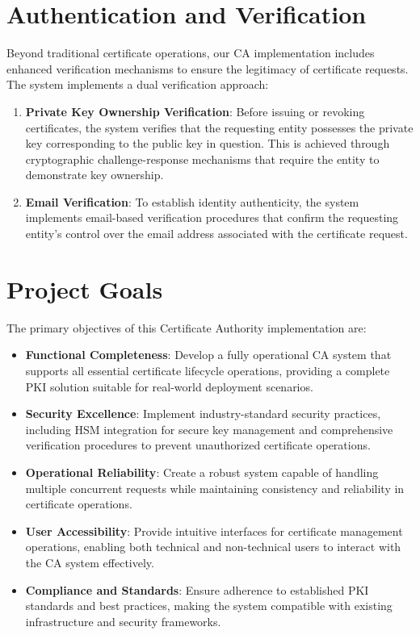 \section{Authentication and Verification}

Beyond traditional certificate operations, our CA implementation includes enhanced verification mechanisms to ensure the legitimacy of certificate requests. The system implements a dual verification approach:

\begin{enumerate}
    \item \textbf{Private Key Ownership Verification}: Before issuing or revoking certificates, the system verifies that the requesting entity possesses the private key corresponding to the public key in question. This is achieved through cryptographic challenge-response mechanisms that require the entity to demonstrate key ownership.
    
    \item \textbf{Email Verification}: To establish identity authenticity, the system implements email-based verification procedures that confirm the requesting entity's control over the email address associated with the certificate request.
\end{enumerate}

\section{Project Goals}

The primary objectives of this Certificate Authority implementation are:

\begin{itemize}
    \item \textbf{Functional Completeness}: Develop a fully operational CA system that supports all essential certificate lifecycle operations, providing a complete PKI solution suitable for real-world deployment scenarios.
    
    \item \textbf{Security Excellence}: Implement industry-standard security practices, including HSM integration for secure key management and comprehensive verification procedures to prevent unauthorized certificate operations.
    
    \item \textbf{Operational Reliability}: Create a robust system capable of handling multiple concurrent requests while maintaining consistency and reliability in certificate operations.
    
    \item \textbf{User Accessibility}: Provide intuitive interfaces for certificate management operations, enabling both technical and non-technical users to interact with the CA system effectively.
    
    \item \textbf{Compliance and Standards}: Ensure adherence to established PKI standards and best practices, making the system compatible with existing infrastructure and security frameworks.
\end{itemize}

